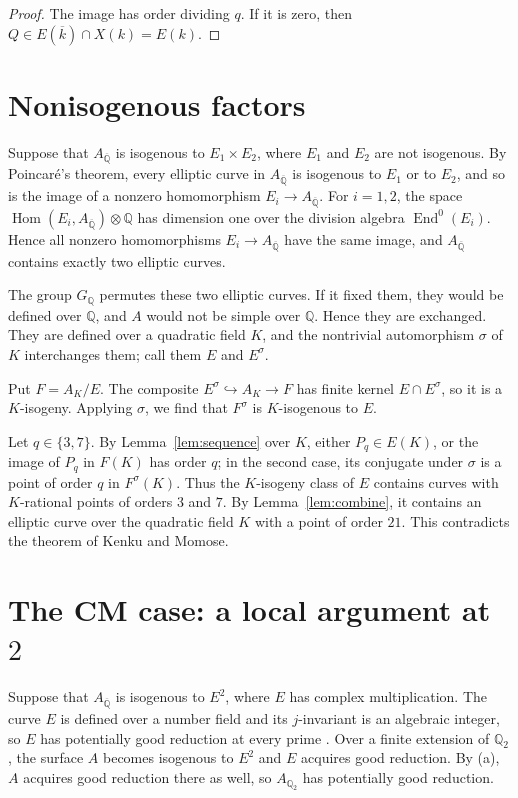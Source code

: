 \documentclass[11pt]{article}
\newcommand{\Q}{\mathbb Q}
\DeclareMathOperator{\End}{End}
\DeclareMathOperator{\Hom}{Hom}
\begin{document}
\begin{proof}
The image has order dividing \(q\). If it is zero, then
\(Q\in E(\overline k)\cap X(k)=E(k)\).
\end{proof}

\section{Nonisogenous factors}\label{sec:nonisogenous}

Suppose that \(A_{\overline{\Q}}\) is isogenous to \(E_1\times E_2\),
where \(E_1\) and \(E_2\) are not isogenous. By Poincar\'e's theorem,
every elliptic curve in \(A_{\overline{\Q}}\) is isogenous to \(E_1\)
or to \(E_2\), and so is the image of a nonzero homomorphism
\(E_i\to A_{\overline{\Q}}\). For \(i=1,2\), the space
\(\Hom(E_i,A_{\overline{\Q}})\otimes\Q\) has dimension one over the
division algebra \(\End^0(E_i)\). Hence all nonzero homomorphisms
\(E_i\to A_{\overline{\Q}}\) have the same image, and
\(A_{\overline{\Q}}\) contains exactly two elliptic curves.

The group \(G_{\Q}\) permutes these two elliptic curves. If it fixed
them, they would be defined over \(\Q\), and \(A\) would not be simple
over \(\Q\). Hence they are exchanged. They are defined over a quadratic
field \(K\), and the nontrivial automorphism \(\sigma\) of \(K\)
interchanges them; call them \(E\) and \(E^\sigma\).

Put \(F=A_K/E\). The composite \(E^\sigma\hookrightarrow A_K\to F\) has
finite kernel \(E\cap E^\sigma\), so it is a \(K\)-isogeny. Applying
\(\sigma\), we find that \(F^\sigma\) is \(K\)-isogenous to \(E\).

Let \(q\in\{3,7\}\). By Lemma~\ref{lem:sequence} over \(K\), either
\(P_q\in E(K)\), or the image of \(P_q\) in \(F(K)\) has order \(q\);
in the second case, its conjugate under \(\sigma\) is a point of order
\(q\) in \(F^\sigma(K)\). Thus the \(K\)-isogeny class of \(E\) contains
curves with \(K\)-rational points of orders \(3\) and \(7\). By
Lemma~\ref{lem:combine}, it contains an elliptic curve over the
quadratic field \(K\) with a point of order \(21\). This contradicts the
theorem of Kenku and Momose.

\section{The CM case: a local argument at \texorpdfstring{\(2\)}{2}}\label{sec:cm}

Suppose that \(A_{\overline{\Q}}\) is isogenous to \(E^2\), where \(E\)
has complex multiplication. The curve \(E\) is defined over a number
field and its \(j\)-invariant is an algebraic integer, so \(E\) has
potentially good reduction at every prime \cite[\S2]{ST}. Over a finite
extension of \(\Q_2\), the surface \(A\) becomes isogenous to \(E^2\)
and \(E\) acquires good reduction. By (a), \(A\) acquires good reduction
there as well, so \(A_{\Q_2}\) has potentially good reduction.
\end{document}
